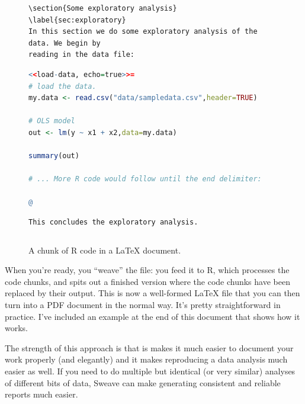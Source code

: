 \documentclass[11pt,article]{memoir}
\begin{document}
\begin{figure}
\begin{lstlisting}[style=sweave-top]

\end{lstlisting} 
\begin{lstlisting}[language={[latex]tex},numbers=none,style=sweave-tex]   
\section{Some exploratory analysis}
\label{sec:exploratory}
In this section we do some exploratory analysis of the data. We begin by
reading in the data file:
\end{lstlisting}
\begin{lstlisting}[language=R,numbers=none,style=sweave-r] 
<<load-data, echo=true>>=
# load the data. 
my.data <- read.csv("data/sampledata.csv",header=TRUE)

# OLS model
out <- lm(y ~ x1 + x2,data=my.data)

summary(out)

# ... More R code would follow until the end delimiter:

@ 
\end{lstlisting}
\begin{lstlisting}[language={[latex]tex},numbers=none,style=sweave-tex] 
% now we are back to normal latex 
This concludes the exploratory analysis. 
\end{lstlisting} 
\begin{lstlisting}[style=sweave-bottom]

\end{lstlisting}
  \caption{A chunk of R code in a LaTeX document.}
\label{fig:codechunk}
\end{figure}

When you're ready, you ``weave'' the file: you feed it to R, which processes the code chunks, and spits out a finished version where the code chunks have been replaced by their output. This is now a well-formed LaTeX file that you can then turn into a PDF document in the normal way. It's pretty straightforward in practice. I've included an example at the end of this document that shows how it works.

The strength of this approach is that is makes it much easier to document your work properly (and elegantly) and it makes reproducing a data analysis much easier as well. If you need to do multiple but identical (or very similar) analyses of different bits of data, Sweave can make generating consistent and reliable reports much easier.
\end{document}

